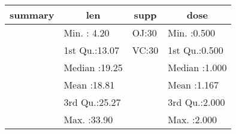 \begin{table}[!tbp]
\begin{center}
\begin{tabular}{llll}
\hline\hline
\multicolumn{1}{l}{summary}&\multicolumn{1}{c}{     len}&\multicolumn{1}{c}{supp}&\multicolumn{1}{c}{     dose}\tabularnewline
\hline
&Min.   : 4.20  &OJ:30  &Min.   :0.500  \tabularnewline
&1st Qu.:13.07  &VC:30  &1st Qu.:0.500  \tabularnewline
&Median :19.25  &&Median :1.000  \tabularnewline
&Mean   :18.81  &&Mean   :1.167  \tabularnewline
&3rd Qu.:25.27  &&3rd Qu.:2.000  \tabularnewline
&Max.   :33.90  &&Max.   :2.000  \tabularnewline
\hline
\end{tabular}\end{center}

\end{table}
